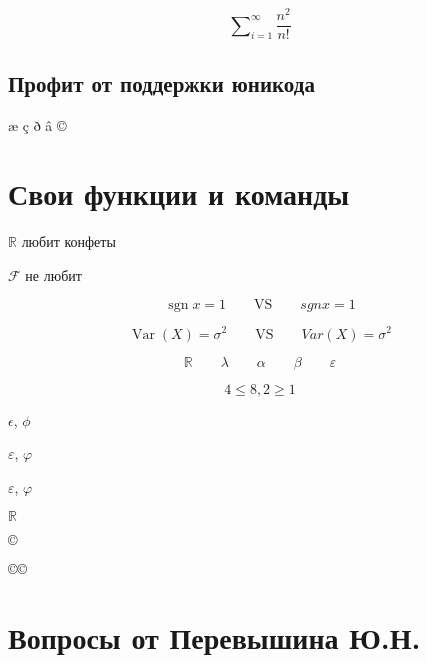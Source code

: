\documentclass[12pt, a4paper]{article}
\DeclareMathOperator{\sgn}{sgn}
\DeclareMathOperator{\Var}{Var}
\begin{document}
\[ \sum\nolimits_{i=1}^{\infty} \frac{n^2}{n!} \]


\subsection{Профит от поддержки юникода}

æ ç ð â ©


\section{Свои функции и команды}

\def\R{\ensuremath{\mathbb{R}}}

\def\F{\ensuremath{\mathcal{F}}{ }}

\R{ } любит конфеты  

\F не любит


\def \a{\alpha}
\def \b{\beta}
\def \la{\lambda}
\def \sg{\sigma}
\def \e{\varepsilon}

\[\sgn  x = 1 \qquad \text{VS} \qquad sgn x = 1\]

\[\Var(X) = \sigma^2 \qquad \text{VS} \qquad Var(X) = \sigma^2\]

\[ \R \qquad \la \qquad \a \qquad \b \qquad \e \]

\[ 4 \le 8, 2 \ge 1\]



$\epsilon$, $\phi$ %

\renewcommand{\phi}{\varphi}
\renewcommand{\epsilon}{\varepsilon}

$\varepsilon$, $\varphi$

$\epsilon$, $\phi$ 


\R

\def \ccc{©}

\newcommand{\сс}{©}

$ \ccc $

\сс   $\сс$

\section{Вопросы от Перевышина Ю.Н.}
\end{document}
